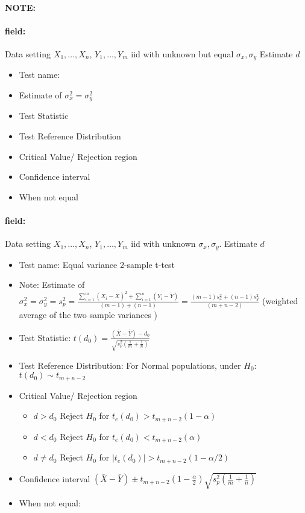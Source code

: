 \documentclass[12pt]{article}
\newenvironment{note}{\paragraph{NOTE:}}{}
\newenvironment{field}{\paragraph{field:}}{}
\begin{document}
\begin{note}
 \begin{field}
  Data setting $X_1, \ldots , X_n$, $Y_1, \ldots, Y_m$ iid with unknown but equal  $\sigma_x, \sigma_y$ Estimate $d$
  \begin{itemize}
   \item Test name:
   \item Estimate of $\sigma_x^2 = \sigma_y^2$
   \item Test Statistic
   \item Test Reference Distribution
   \item Critical Value/ Rejection region
   \item Confidence interval
   \item When not equal
  \end{itemize}
 \end{field}
 \begin{field}
  Data setting $X_1, \ldots , X_n$, $Y_1, \ldots, Y_m$ iid with unknown $\sigma_x, \sigma_y$. Estimate $d$
  \begin{itemize}
   \item Test name: Equal variance 2-sample t-test
   \item Note: Estimate of $\sigma_x^2 = \sigma_y^2 = s_p^2 = \frac{\sum_{i=1}^m (X_i - \bar{X})^2 + \sum_{i=1}^n (Y_i - \bar{Y})}{(m-1) + (n-1)} = \frac{(m-1)s_x^2 + (n-1)s_y^2}{(m+n-2)}$ (weighted average of the two sample variances )
   \item Test Statistic: $t(d_0) = \frac{(\bar{X} - \bar{Y}) - d_0}{\sqrt{s_p^2(\frac{1}{m} + \frac{1}{n})}}$
   \item Test Reference Distribution: For Normal populations, under $H_0$: $t(d_0) \sim t_{m+n-2}$
   \item Critical Value/ Rejection region
         \begin{itemize}
          \item $d > d_0$ Reject $H_0$ for $t_e(d_0) > t_{m+n-2}(1 - \alpha)$
          \item $d < d_0$ Reject $H_0$ for $t_e(d_0) < t_{m+n-2}(\alpha)$
          \item $d \neq d_0$ Reject $H_0$ for $|t_e(d_0)| > t_{m+n-2}(1 - \alpha/2)$
         \end{itemize}
   \item Confidence interval $ (\bar{X} - \bar{Y}) \pm t_{m+n-2}(1 - \frac{\alpha}{2})\sqrt{s_p^2(\frac{1}{m} + \frac{1}{n})}$
   \item When not equal:
         \begin{itemize}

\end{itemize}
\end{itemize}
\end{field}
\end{note}
\end{document}

